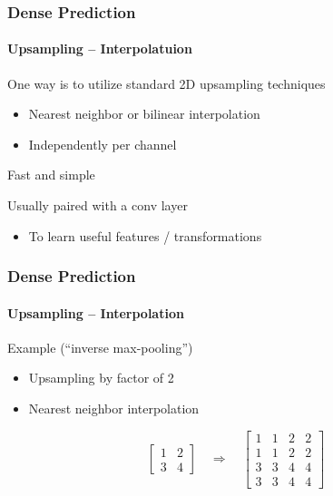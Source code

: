 \documentclass[xetex,professionalfont]{beamer}
\begin{document}
\begin{frame}
	\frametitle{Dense Prediction}
	\framesubtitle{Upsampling -- Interpolatuion}

	One way is to utilize standard 2D upsampling techniques
	\begin{itemize}
		\item Nearest neighbor or bilinear interpolation
		\item Independently per channel
	\end{itemize}

	\bigskip

	Fast and simple

	\bigskip

	Usually paired with a conv layer
	\begin{itemize}
		\item To learn useful features / transformations
	\end{itemize}

\end{frame}


\begin{frame}
	\frametitle{Dense Prediction}
	\framesubtitle{Upsampling -- Interpolation}

	Example (\enquote{inverse max-pooling}) %
	\begin{itemize}
		\item Upsampling by factor of 2
		\item Nearest neighbor interpolation
	\end{itemize}

	\medskip

	\[
		\begin{bmatrix}
			1 & 2 \\
			3 & 4
		\end{bmatrix}
		\quad\Longrightarrow\quad
		\begin{bmatrix}
			1 & 1 & 2 & 2 \\
			1 & 1 & 2 & 2 \\
			3 & 3 & 4 & 4 \\
			3 & 3 & 4 & 4
		\end{bmatrix}
	\]

\end{frame}
\end{document}
